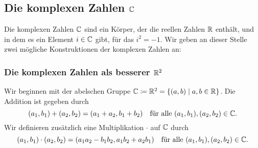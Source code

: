 \subsection{Die komplexen Zahlen \texorpdfstring{$\mathbb{C}$}{C}}
Die komplexen Zahlen $\mathbb{C}$ sind ein Körper, der die reellen Zahlen $\mathbb{R}$ enthält, und in dem es ein Element $i \in \mathbb{C}$ gibt, für das $i^2 = -1$. Wir geben an dieser Stelle zwei mögliche Konstruktionen der komplexen Zahlen an:


\subsubsection{Die komplexen Zahlen als besserer \texorpdfstring{$\mathbb{R}^2$}{R2}}
Wir beginnen mit der abelschen Gruppe $\mathbb{C} \coloneqq \mathbb{R}^2 = \{(a,b) \mid a,b \in \mathbb{R}\}$. Die Addition ist gegeben durch
\[
 (a_1, b_1) + (a_2, b_2) = (a_1 + a_2, b_1 + b_2)
 \quad\text{für alle $(a_1, b_1), (a_2, b_2) \in \mathbb{C}$}.
\]
Wir definieren zusätzlich eine Multiplikation $\cdot$ auf $\mathbb{C}$ durch
\[
 (a_1, b_1) \cdot (a_2, b_2)
 = (a_1 a_2 - b_1 b_2, a_1 b_2 + a_2 b_1)
 \quad\text{für alle $(a_1, b_1), (a_2, b_2) \in \mathbb{C}$}.
\]

